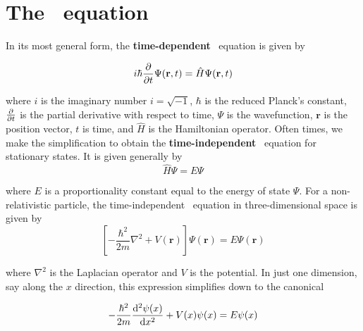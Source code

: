 \section{The \Sch\ equation}
In its most general form, the \textbf{time-dependent} \Sch\ equation is given by 
\begin{tcolorbox}[title=Time-dependent \Sch\ equation] \vspace{-2ex}
\begin{equation*}
	i\hbar \pdv{t} \Psi(\textbf{r}, t) = \hat{H}\Psi(\textbf{r}, t)
\end{equation*}
\end{tcolorbox}

where $i$ is the imaginary number $i=\sqrt{-1}$, $\hbar$ is the reduced Planck's constant, $\pdv{t}$ is the partial derivative with respect to time, $\Psi$ is the wavefunction, $\mathbf{r}$ is the position vector, $t$ is time, and $\hat{H}$ is the Hamiltonian operator. Often times, we make the simplification to obtain the \textbf{time-independent} \Sch\ equation for stationary states. It is given generally by
\begin{equation*}
\hat{H}\Psi = E\Psi
\end{equation*}

where $E$ is a proportionality constant equal to the energy of state $\Psi$. For a non-relativistic particle, the time-independent \Sch\ equation in three-dimensional space is given by 
\begin{equation*}
\left[ -\dfrac{\hbar^2}{2m} \nabla^2 + V(\mathbf{r}) \right]\Psi(\mathbf{r}) = E\Psi(\mathbf{r})
\end{equation*}

where $\nabla^2$ is the Laplacian operator and $V$ is the potential. In just one dimension, say along the $x$ direction, this expression simplifies down to the canonical
\begin{tcolorbox}[title=Time-independent \Sch\ equation] \vspace{-2ex}
\[ -\dfrac{\hbar^2}{2m} \dv[2]{\psi(x)}{x} + V(x)\psi(x) = E\psi(x) \]
\end{tcolorbox}

%
